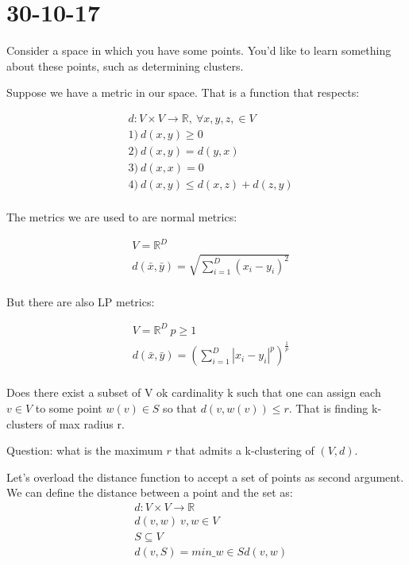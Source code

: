 \documentclass[]{article}
\begin{document}
\section{30-10-17}

Consider a space in which you have some points. You'd like to learn something about these points, such as determining clusters.

Suppose we have a metric in our space. That is a function that respects:

\begin{align*}
& d: V \times V \rightarrow \mathbb{R},\ \forall x,y,z, \in V\\
&1)\ d(x,y) \geq 0\\
&2)\ d(x,y) = d(y,x)\\
&3)\ d(x,x) = 0\\
&4)\ d(x,y) \leq d(x,z) + d(z,y)\\
\end{align*}

The metrics we are used to are normal metrics:

\begin{align*}
&V = \mathbb{R}^D\\
&d(\bar{x}, \bar{y}) = \sqrt{\sum_{i=1}^{D} \left(x_i - y_i\right)^2}\\
\end{align*}

But there are also LP metrics:

\begin{align*}
&V = \mathbb{R}^D\ p \geq 1\\
&d(\bar{x}, \bar{y}) = {\left(\sum_{i=1}^{D} |x_i - y_i|^p\right)}^{\frac{1}{p}}\\
\end{align*}


Does there exist a subset of V ok cardinality k such that one can assign each $v \in V$ to some point $w(v)\in S$ so that $ d(v, w(v)) \leq r $. That is finding k-clusters of max radius r.

Question: what is the maximum $ r $ that admits a k-clustering of $ (V,d) $.

Let's overload the distance function to accept a set of points as second argument. We can define the distance between a point and the set as:
\begin{align*}
& d: V \times V \rightarrow \mathbb{R}\\
&d(v,w)\ v, w \in V\\
&S \subseteq V\\
&d(v, S) = {min}\_{w \in S} d(v, w)\\
\end{align*}
\end{document}

